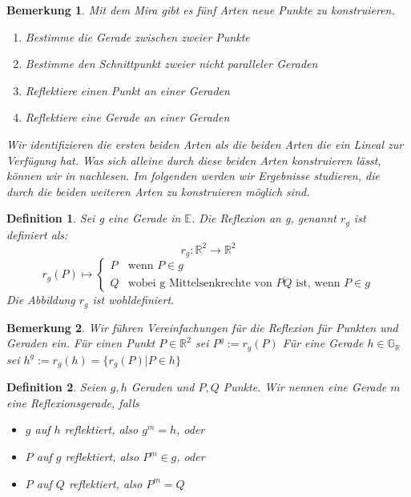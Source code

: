 \documentclass{scrbook}
\newtheorem{definition}{Definition}
\newtheorem{remark}{Bemerkung}
\begin{document}
\begin{remark}
    Mit dem Mira gibt es fünf Arten neue Punkte zu konstruieren.
    \begin{enumerate}
        \item Bestimme die Gerade zwischen zweier Punkte
        \item Bestimme den Schnittpunkt zweier nicht paralleler Geraden
        \item Reflektiere einen Punkt an einer Geraden
        \item Reflektiere eine Gerade an einer Geraden
    \end{enumerate}

    Wir identifizieren die ersten beiden Arten als die beiden Arten die ein Lineal zur Verfügung hat.
    Was sich alleine durch diese beiden Arten konstruieren lässt, können wir in \cite{Vogel} nachlesen.
    Im folgenden werden wir Ergebnisse studieren, die durch die beiden weiteren Arten zu konstruieren möglich sind. 
\end{remark}

\begin{definition}
    \label{Reflexion}
    Sei g eine Gerade in $\mathbb{E}$. Die Reflexion an g, genannt $r_g$ ist definiert als:
    $$r_g: \mathbb{R}^2 \longrightarrow \mathbb{R}^2$$
    $$r_g(P) \longmapsto \begin{cases}
    P & \text{wenn } P \in g \\
    Q & \text{wobei g Mittelsenkrechte von } \overline{PQ} \text{ ist, wenn } P \in g
    \end{cases}
    $$
    Die Abbildung $r_g$ ist wohldefiniert.
\end{definition}

\begin{remark}
    Wir führen Vereinfachungen für die Reflexion für Punkten und Geraden ein.
    Für einen Punkt $P \in \mathbb{R}^2$ sei $P^g := r_g(P)$
    Für eine Gerade $h \in \mathbb{G_R}$ sei $h^g := r_g(h) = \{r_g(P)|P \in h\}$
\end{remark}

\begin{definition}
    \label{Reflexionsgerade}
    Seien $g, h$ Geraden und $P, Q$ Punkte. Wir nennen eine Gerade $m$ eine Reflexionsgerade, falls
    \begin{itemize}
        \item $g$ auf $h$ reflektiert, also $g^m=h$, oder
        \item $P$ auf $g$ reflektiert, also $P^m \in g$, oder
        \item $P$ auf $Q$ reflektiert, also $P^m = Q$
    \end{itemize}
    
\end{definition}
\end{document}
